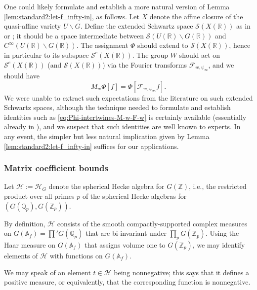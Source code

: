 \documentclass[reqno]{amsart}
\theoremstyle{plain} \newtheorem{theorem} {Theorem}
\theoremstyle{definition} \newtheorem{definition} [theorem] {Definition}
\theoremstyle{itplain} %
\numberwithin{equation}{section}
\numberwithin{theorem}{section}
\begin{document}
\begin{remark}\label{rmk:one-could-likely}
  One could likely formulate and establish a more natural version of Lemma \ref{lem:standard2:let-f_infty-in}, as follows.  Let $X$ denote the affine closure of the quasi-affine variety $U \backslash G$.  Define the extended Schwartz space $\mathcal{S}(X(\mathbb{R}))$ as in \cite[Definition 5.5]{2021arXiv210310261G} or \cite[\S7.1]{MR1694894}; it should be a space intermediate between $\mathcal{S}(U(\mathbb{R}) \backslash G(\mathbb{R}))$ and $C^\infty(U(\mathbb{R}) \backslash G(\mathbb{R}))$.  The assignment $\Phi$ should extend to $\mathcal{S}(X(\mathbb{R}))$, hence in particular to its subspace $\mathcal{S}^e(X(\mathbb{R}))$.  The group $W$ should act on $\mathcal{S}^e(X(\mathbb{R}))$ (and $\mathcal{S}(X(\mathbb{R}))$) via the Fourier transforms $\mathcal{F}_{w,\psi_\infty}$, and we should have
  \begin{equation}\label{eq:Phi-intertwines-M-w-F-w}
    M_w \Phi[f] = \Phi[\mathcal{F}_{w,\psi_\infty} f].
  \end{equation}
  We were unable to extract such expectations from the literature on such extended Schwartz spaces, although the technique needed to formulate and establish identities such as \eqref{eq:Phi-intertwines-M-w-F-w} is certainly available (essentially already in \cite[\S3.5]{MR3468638}), and we suspect that such identities are well known to experts.  In any event, the simpler but less natural implication given by Lemma \ref{lem:standard2:let-f_infty-in} suffices for our applications.
\end{remark}

\subsubsection{Matrix coefficient bounds}\label{sec:matr-coeff-bounds}
Let $\mathcal{H} := \mathcal{H}_G$ denote the spherical Hecke algebra for $G(\mathbb{Z})$, i.e., the restricted product over all primes $p$ of the spherical Hecke algebras for $(G(\mathbb{Q}_p), G(\mathbb{Z}_p))$.

By definition, $\mathcal{H}$ consists of the smooth compactly-supported complex measures on $G(\mathbb{A}_f) = \prod ' G(\mathbb{Q}_p)$ that are bi-invariant under $\prod_p G(\mathbb{Z}_p)$.  Using the Haar measure on $G(\mathbb{A}_f)$ that assigns volume one to $G(\mathbb{Z}_p)$, we may identify elements of $\mathcal{H}$ with functions on $G(\mathbb{A}_f)$.

We may speak of an element $t \in \mathcal{H}$ being nonnegative; this says that it defines a positive measure, or equivalently, that the corresponding function is nonnegative.
\end{document}
